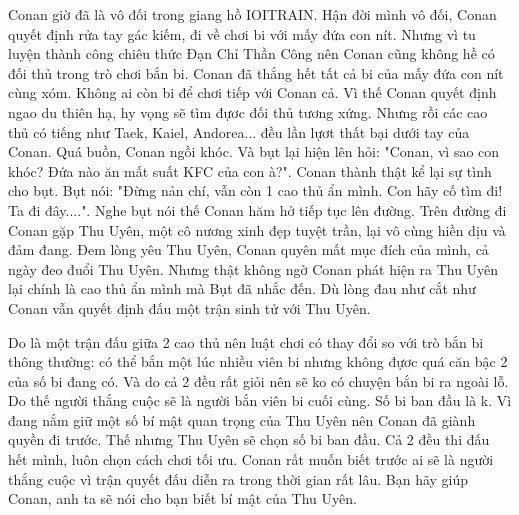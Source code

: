Conan giờ đã là vô đối trong giang hồ IOITRAIN. Hận đời mình vô đối, Conan quyết định rửa tay gác kiếm, đi về chơi bi với mấy đứa con nít. Nhưng vì tu luyện thành công chiêu thức Đạn Chỉ Thần Công nên Conan cũng không hề có đối thủ trong trò chơi bắn bi. Conan đã thắng hết tất cả bi của mấy đứa con nít cùng xóm. Không ai còn bi để chơi tiếp với Conan cả. Vì thế Conan quyết định ngao du thiên hạ, hy vọng sẽ tìm đựơc đối thủ tương xứng. Nhưng rồi các cao thủ có tiếng như Taek, Kaiel, Andorea... đều lần lựơt thất bại dưới tay của Conan. Quá buồn, Conan ngồi khóc. Và bụt lại hiện lên hỏi: "Conan, vì sao con khóc? Đứa nào ăn mất suất KFC của con à?". Conan thành thật kể lại sự tình cho bụt. Bụt nói: "Đừng nản chí, vẫn còn 1 cao thủ ẩn mình. Con hãy cố tìm đi! Ta đi đây....". Nghe bụt nói thế Conan hăm hở tiếp tục lên đường. Trên đường đi Conan gặp Thu Uyên, một cô nương xinh đẹp tuyệt trần, lại vô cùng hiền dịu và đảm đang. Đem lòng yêu Thu Uyên, Conan quyên mất mục đích của mình, cả ngày đeo đuổi Thu Uyên. Nhưng thật không ngờ Conan phát hiện ra Thu Uyên lại chính là cao thủ ẩn mình mà Bụt đã nhắc đến. Dù lòng đau như cắt như Conan vẫn quyết định đấu một trận sinh tử với Thu Uyên.  

   Do là một trận đấu giữa 2 cao thủ nên luật chơi có thay đổi so với trò bắn bi thông thường: có thể bắn một lúc nhiều viên bi nhưng không đựơc quá căn bậc 2 của số bi đang có. Và do cả 2 đều rất giỏi nên sẽ ko có chuyện bắn bi ra ngoài lỗ. Do thế người thắng cuộc sẽ là người bắn viên bi cuối cùng. Số bi ban đầu là k. Vì đang nắm giữ một số bí mật quan trọng của Thu Uyên nên Conan đã giành quyền đi trước. Thế nhưng Thu Uyên sẽ chọn số bi ban đầu. Cả 2 đều thi đấu hết mình, luôn chọn cách chơi tối ưu. Conan rất muốn biết trước ai sẽ là người thắng cuộc vì trận quyết đấu diễn ra trong thời gian rất lâu. Bạn hãy giúp Conan, anh ta sẽ nói cho bạn biết bí mật của Thu Uyên.